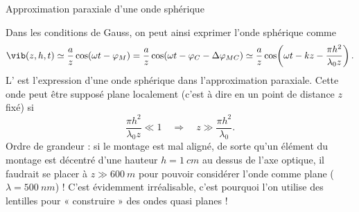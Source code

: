 \begin{exo}[PC][2][TD]{Approximation paraxiale d'une onde sphérique}
\begin{quest}
{      Dans les conditions de Gauss, on peut ainsi exprimer l'onde sphérique comme
      \begin{equation}\label{eq:parax}
      \vib(z,h,t)\simeq \frac{a}{z}\cos(\omega t-\varphi_M) = \frac{a}{z}\cos(\omega t-\varphi_C -\Delta\varphi_{MC}) \simeq \frac{a}{z}\cos\!\left(\omega t-kz -\frac{\pi h^2}{\lambda_0 z}\right).
      \end{equation}
      L' est l'expression d'une onde sphérique dans l'approximation paraxiale. Cette onde peut être supposé  plane localement (c'est à dire en un point de distance $z$ fixé) si
      \begin{equation}
      \frac{\pi h^2}{\lambda_0 z}\ll 1\quad\Rightarrow\quad \boxed{z \gg \displaystyle\frac{\pi h^2}{\lambda_0}}.
      \end{equation}
      Ordre de grandeur : si le montage est mal aligné, de sorte qu'un élément du montage est décentré d'une hauteur $h=\SI{1}{cm}$ au dessus de l'axe optique, il faudrait se placer à $z\gg\SI{600}{m}$ pour pouvoir considérer l'onde comme plane ($\lambda=\SI{500}{nm}$) ! C'est évidemment irréalisable, c'est pourquoi l'on utilise des lentilles pour « construire » des ondes quasi planes !
    }
    \end{quest}

\end{exo}
